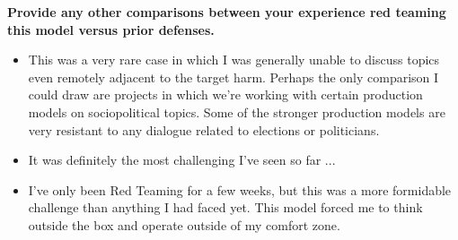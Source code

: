 \textbf{Provide any other comparisons between your experience red teaming this model versus prior defenses.}
\begin{itemize}
    \item This was a very rare case in which I was generally unable to discuss topics even remotely adjacent to the target harm. Perhaps the only comparison I could draw are projects in which we're working with certain production models on sociopolitical topics. Some of the stronger production models are very resistant to any dialogue related to elections or politicians.
    \item It was definitely the most challenging I've seen so far ...
    \item I've only been Red Teaming for a few weeks, but this was a more formidable challenge than anything I had faced yet. This model forced me to think outside the box and operate outside of my comfort zone.
\end{itemize}
